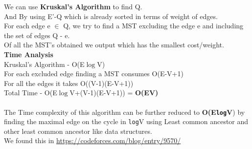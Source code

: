\documentclass{report}
\begin{document}
 We can use \textbf{Kruskal's Algorithm} to find Q.\\
 And By using E'-Q which is already sorted in terms of weight of edges.\\
 For each edge e $\in$ Q, we try to find a MST excluding the edge e and including the set of edges Q - {e}.\\
 Of all the MST's obtained we output which has the smallest cost/weight.\\
\textbf{Time Analysis}\\
 Kruskal's Algorithm - O(E$\log$V)\\
 For each excluded edge finding a MST consumes O(E-V+1)\\
 For all the edges it takes O((V-1)(E-V+1))\\
 Total Time - O(E$\log$V+(V-1)(E-V+1)) = \textbf{O(EV)}\\
 \vspace*{0.5em}\\
 The Time complexity of this algorithm can be further reduced to \textbf{O(E\texttt{log}V}) by finding the maximal edge on the cycle in \texttt{log}V using Least common ancestor and other least common ancestor like data structures.\\ We found this in \url{https://codeforces.com/blog/entry/9570/}
 
 
\end{document}
